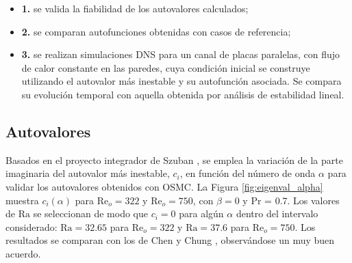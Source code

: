 \begin{itemize}
	\item \textbf{1.} se valida la fiabilidad de los autovalores calculados;
	\item \textbf{2.} se comparan autofunciones obtenidas con casos de referencia;
	\item \textbf{3.} se realizan simulaciones DNS para un canal de placas paralelas, con flujo de calor constante en las paredes, cuya condición inicial se construye utilizando el autovalor más inestable y su autofunción asociada. Se compara su evolución temporal con aquella obtenida por análisis de estabilidad lineal.
\end{itemize}

\subsection{Autovalores}


Basados en el proyecto integrador de Szuban \cite{szuban2023}, se emplea la variación de la parte imaginaria del autovalor más inestable, $c_i$, en función del número de onda $\alpha$ para validar los autovalores obtenidos con OSMC. La Figura \ref{fig:eigenval_alpha} muestra $c_i(\alpha)$ para $\mathrm{Re}_o=322$ y $\mathrm{Re}_o=750$, con $\beta=0$ y Pr = 0.7. Los valores de $\mathrm{Ra}$ se seleccionan de modo que $c_i=0$ para algún $\alpha$ dentro del intervalo considerado: $\mathrm{Ra}=32$.$65$ para $\mathrm{Re}_o=322$ y $\mathrm{Ra}=37$.$6$ para $\mathrm{Re}_o=750$. Los resultados se comparan con los de Chen y Chung \cite{chen1996linear}, observándose un muy buen acuerdo.

